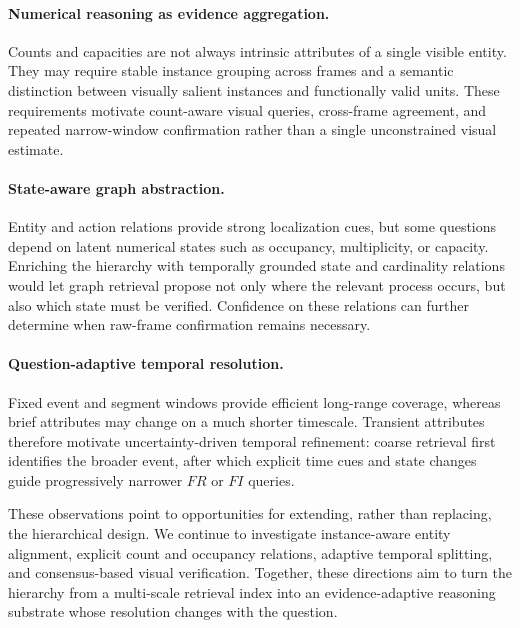 \documentclass[letterpaper]{article}
\begin{document}
\paragraph{Numerical reasoning as evidence aggregation.}
Counts and capacities are not always intrinsic attributes of a single visible entity.
They may require stable instance grouping across frames and a semantic distinction between visually salient instances and functionally valid units.
These requirements motivate count-aware visual queries, cross-frame agreement, and repeated narrow-window confirmation rather than a single unconstrained visual estimate.

\paragraph{State-aware graph abstraction.}
Entity and action relations provide strong localization cues, but some questions depend on latent numerical states such as occupancy, multiplicity, or capacity.
Enriching the hierarchy with temporally grounded state and cardinality relations would let graph retrieval propose not only where the relevant process occurs, but also which state must be verified.
Confidence on these relations can further determine when raw-frame confirmation remains necessary.

\paragraph{Question-adaptive temporal resolution.}
Fixed event and segment windows provide efficient long-range coverage, whereas brief attributes may change on a much shorter timescale.
Transient attributes therefore motivate uncertainty-driven temporal refinement: coarse retrieval first identifies the broader event, after which explicit time cues and state changes guide progressively narrower $FR$ or $FI$ queries.

These observations point to opportunities for extending, rather than replacing, the hierarchical design.
We continue to investigate instance-aware entity alignment, explicit count and occupancy relations, adaptive temporal splitting, and consensus-based visual verification.
Together, these directions aim to turn the hierarchy from a multi-scale retrieval index into an evidence-adaptive reasoning substrate whose resolution changes with the question.
\end{document}
